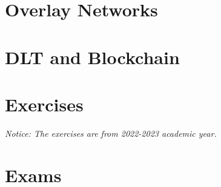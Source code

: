 \documentclass{article}
\begin{document}
\newpage
\section{Overlay Networks}

\newpage
\section{DLT and Blockchain}
	
\newpage
\section{Exercises}
\emph{Notice: The exercises are from 2022-2023 academic year.}

\newpage
\section{Exams}

	
\end{document}

